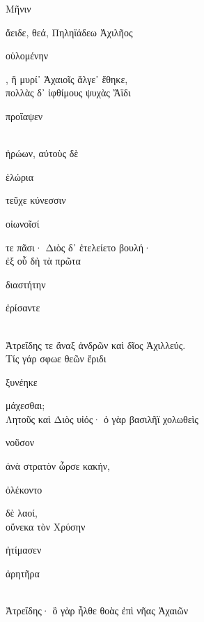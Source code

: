 \documentclass{ransom}
\begin{document}

\renewcommand{\rightheaderwhat}{\rightheaderwhatglosses}%
\begin{foreignpage}
\begin{graytext}
\begin{whitetext}Μῆνιν\end{whitetext} ἄειδε, θεά, Πηληϊάδεω Ἀχιλῆος\\
\begin{whitetext}οὐλομένην\end{whitetext}, ἣ μυρί᾽ Ἀχαιοῖς ἄλγε᾽ ἔθηκε,\\
πολλὰς δ᾽ ἰφθίμους ψυχὰς Ἄϊδι \begin{whitetext}προΐαψεν\end{whitetext}\\
ἡρώων, αὐτοὺς δὲ \begin{whitetext}ἑλώρια\end{whitetext} τεῦχε κύνεσσιν\\
\begin{whitetext}οἰωνοῖσί\end{whitetext} τε πᾶσι· Διὸς δ᾽ ἐτελείετο βουλή·\hfill{}\\
ἐξ οὗ δὴ τὰ πρῶτα \begin{whitetext}διαστήτην\end{whitetext} \begin{whitetext}ἐρίσαντε\end{whitetext}\\
Ἀτρεΐδης τε ἄναξ ἀνδρῶν καὶ δῖος Ἀχιλλεύς.\\
Τίς γάρ σφωε θεῶν ἔριδι \begin{whitetext}ξυνέηκε\end{whitetext} μάχεσθαι;\\
Λητοῦς καὶ Διὸς υἱός· ὁ γὰρ βασιλῆϊ χολωθεὶς\\
\begin{whitetext}νοῦσον\end{whitetext} ἀνὰ στρατὸν ὦρσε κακήν, \begin{whitetext}ὀλέκοντο\end{whitetext} δὲ λαοί,\hfill{}\\
οὕνεκα τὸν Χρύσην \begin{whitetext}ἠτίμασεν\end{whitetext} \begin{whitetext}ἀρητῆρα\end{whitetext}\\
Ἀτρεΐδης· ὃ γὰρ ἦλθε θοὰς ἐπὶ νῆας Ἀχαιῶν\\

\end{graytext}
\end{foreignpage}
\end{document}
